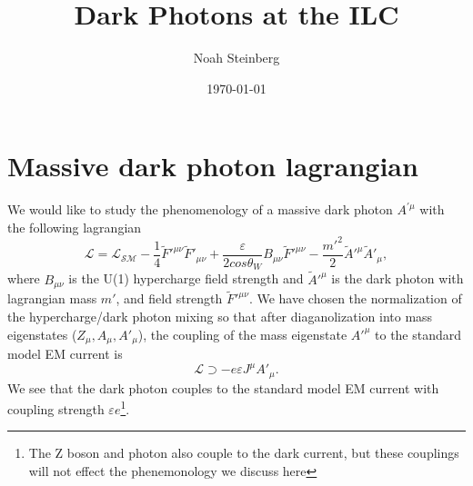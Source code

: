 \documentclass[aps,onecolumn,twoside,secnumarabic,balancelastpage,amsmath,amssymb,nofootinbib,hyperref=pdftex]{revtex4}
\begin{document}
\title{Dark Photons at the ILC}
\author         {Noah Steinberg}
\date{\today}

\maketitle

\section {Massive dark photon lagrangian}

We would like to study the phenomenology of a massive dark photon $A^{'\mu}$ with the following lagrangian
\begin{equation}
\mathcal{L} = \mathcal{L_{\text{SM}}} - \frac{1}{4}\tilde{F}'^{\mu\nu}\tilde{F}'_{\mu\nu} + \frac{\varepsilon}{2cos\theta_{W}}B_{\mu\nu}\tilde{F}'^{\mu\nu} - \frac{m'^{2}}{2}\tilde{A}'^{\mu}\tilde{A}'_{\mu},
\end{equation}
where $B_{\mu\nu}$ is the U(1) hypercharge field strength and $\tilde{A}'^{\mu}$ is the dark photon with lagrangian mass $m'$, and field strength $\tilde{F}'^{\mu\nu}$. We have chosen the normalization of the hypercharge/dark photon mixing so that after diaganolization into mass eigenstates ($Z_{\mu}, A_{\mu}, A'_{\mu}$), the coupling of the mass eigenstate $A'^{\mu}$ to the standard model EM current is
\begin{equation}
\mathcal{L} \supset -e\varepsilon J^{\mu}A'_{\mu}.
\end{equation}
We see that the dark photon couples to the standard model EM current with coupling strength $\varepsilon e$\footnote{The Z boson and photon also couple to the dark current, but these couplings will not effect the phenemonology we discuss here}.
\end{document}
